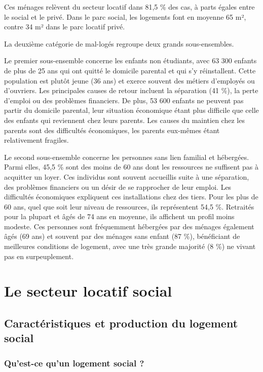 \documentclass[a4paper, 12pt]{report}
\begin{document}
Ces ménages relèvent du secteur locatif dans 81,5 \% des cas, à parts égales entre le social et le privé. Dans le parc social, les logements font en moyenne 65 m², contre 34 m² dans le parc locatif privé.

La deuxième catégorie de mal-logés regroupe deux grands sous-ensembles.

Le premier sous-ensemble concerne les enfants non étudiants, avec 63 300 enfants de plus de 25 ans qui ont quitté le domicile parental et qui s’y réinstallent. Cette population est plutôt jeune (36 ans) et exerce souvent des métiers d’employés ou d’ouvriers. Les principales causes de retour incluent la séparation (41 \%), la perte d’emploi ou des problèmes financiers. De plus, 53 600 enfants ne peuvent pas partir du domicile parental, leur situation économique étant plus difficile que celle des enfants qui reviennent chez leurs parents. Les causes du maintien chez les parents sont des difficultés économiques, les parents eux-mêmes étant relativement fragiles.

Le second sous-ensemble concerne les personnes sans lien familial et hébergées. Parmi elles, 45,5 \% sont des moins de 60 ans dont les ressources ne suffisent pas à acquitter un loyer. Ces individus sont souvent accueillis suite à une séparation, des problèmes financiers ou un désir de se rapprocher de leur emploi. Les difficultés économiques expliquent ces installations chez des tiers. Pour les plus de 60 ans, quel que soit leur niveau de ressources, ils représentent 54,5 \%. Retraités pour la plupart et âgés de 74 ans en moyenne, ils affichent un profil moins modeste. Ces personnes sont fréquemment hébergées par des ménages également âgés (69 ans) et souvent par des ménages sans enfant (87 \%), bénéficiant de meilleures conditions de logement, avec une très grande majorité (8 \%) ne vivant pas en surpeuplement.

\chapter{Le secteur locatif social}

\section{Caractéristiques et production du logement social}

\subsection{Qu'est-ce qu'un logement social ?}
\end{document}
